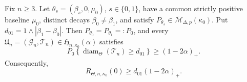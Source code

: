 Fix \(n\geq3\). Let \(\theta_s=(\beta_s,0,\mu_0)\), \(s\in\{0,1\}\), have a common strictly positive baseline \(\mu_0\), distinct decays \(\beta_0\neq\beta_1\), and satisfy \(P_{\theta_s}\in\overline{\mathcal M}_{\Delta,p}(\kappa_0)\). Put \(d_{01}=1\wedge|\beta_1-\beta_0|\). Then \(P_{\theta_0}=P_{\theta_1}=:P_0\), and every \(\mathfrak U_n=(\mathcal G_n,\mathcal T_n)\in\mathfrak H_{n,\kappa_0}(\alpha)\) satisfies
\[
 P_0\!\left\{\operatorname{diam}_{\Theta}(\mathcal T_n)\geq d_{01}\right\}\geq(1-2\alpha)_+.
\]
Consequently,
\[
 R_{\Theta,n,\kappa_0}(0)\geq d_{01}(1-2\alpha)_+.
\]